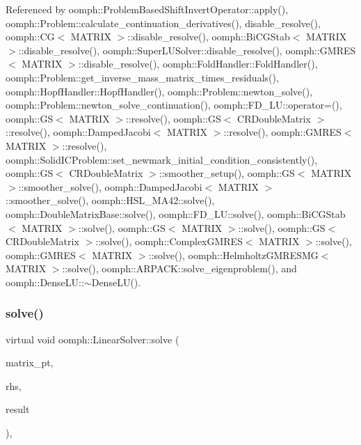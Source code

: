 Referenced by oomph\+::\+Problem\+Based\+Shift\+Invert\+Operator\+::apply(), oomph\+::\+Problem\+::calculate\+\_\+continuation\+\_\+derivatives(), disable\+\_\+resolve(), oomph\+::\+C\+G$<$ M\+A\+T\+R\+I\+X $>$\+::disable\+\_\+resolve(), oomph\+::\+Bi\+C\+G\+Stab$<$ M\+A\+T\+R\+I\+X $>$\+::disable\+\_\+resolve(), oomph\+::\+Super\+L\+U\+Solver\+::disable\+\_\+resolve(), oomph\+::\+G\+M\+R\+E\+S$<$ M\+A\+T\+R\+I\+X $>$\+::disable\+\_\+resolve(), oomph\+::\+Fold\+Handler\+::\+Fold\+Handler(), oomph\+::\+Problem\+::get\+\_\+inverse\+\_\+mass\+\_\+matrix\+\_\+times\+\_\+residuals(), oomph\+::\+Hopf\+Handler\+::\+Hopf\+Handler(), oomph\+::\+Problem\+::newton\+\_\+solve(), oomph\+::\+Problem\+::newton\+\_\+solve\+\_\+continuation(), oomph\+::\+F\+D\+\_\+\+L\+U\+::operator=(), oomph\+::\+G\+S$<$ M\+A\+T\+R\+I\+X $>$\+::resolve(), oomph\+::\+G\+S$<$ C\+R\+Double\+Matrix $>$\+::resolve(), oomph\+::\+Damped\+Jacobi$<$ M\+A\+T\+R\+I\+X $>$\+::resolve(), oomph\+::\+G\+M\+R\+E\+S$<$ M\+A\+T\+R\+I\+X $>$\+::resolve(), oomph\+::\+Solid\+I\+C\+Problem\+::set\+\_\+newmark\+\_\+initial\+\_\+condition\+\_\+consistently(), oomph\+::\+G\+S$<$ C\+R\+Double\+Matrix $>$\+::smoother\+\_\+setup(), oomph\+::\+G\+S$<$ M\+A\+T\+R\+I\+X $>$\+::smoother\+\_\+solve(), oomph\+::\+Damped\+Jacobi$<$ M\+A\+T\+R\+I\+X $>$\+::smoother\+\_\+solve(), oomph\+::\+H\+S\+L\+\_\+\+M\+A42\+::solve(), oomph\+::\+Double\+Matrix\+Base\+::solve(), oomph\+::\+F\+D\+\_\+\+L\+U\+::solve(), oomph\+::\+Bi\+C\+G\+Stab$<$ M\+A\+T\+R\+I\+X $>$\+::solve(), oomph\+::\+G\+S$<$ M\+A\+T\+R\+I\+X $>$\+::solve(), oomph\+::\+G\+S$<$ C\+R\+Double\+Matrix $>$\+::solve(), oomph\+::\+Complex\+G\+M\+R\+E\+S$<$ M\+A\+T\+R\+I\+X $>$\+::solve(), oomph\+::\+G\+M\+R\+E\+S$<$ M\+A\+T\+R\+I\+X $>$\+::solve(), oomph\+::\+Helmholtz\+G\+M\+R\+E\+S\+M\+G$<$ M\+A\+T\+R\+I\+X $>$\+::solve(), oomph\+::\+A\+R\+P\+A\+C\+K\+::solve\+\_\+eigenproblem(), and oomph\+::\+Dense\+L\+U\+::$\sim$\+Dense\+L\+U().

\mbox{\label{classoomph_1_1LinearSolver_a546c09822d18191df14caed864c04c09}} 
\subsubsection{\texorpdfstring{solve()}{solve()}\hspace{0.1cm}{\footnotesize\ttfamily [2/3]}}
{\footnotesize\ttfamily virtual void oomph\+::\+Linear\+Solver\+::solve (\begin{DoxyParamCaption}\item[{\hyperlink{classoomph_1_1DoubleMatrixBase}{Double\+Matrix\+Base} $\ast$const \&}]{matrix\+\_\+pt,  }\item[{const \hyperlink{classoomph_1_1DoubleVector}{Double\+Vector} \&}]{rhs,  }\item[{\hyperlink{classoomph_1_1DoubleVector}{Double\+Vector} \&}]{result }\end{DoxyParamCaption})\hspace{0.3cm}{\ttfamily [inline]}, {\ttfamily [virtual]}}



